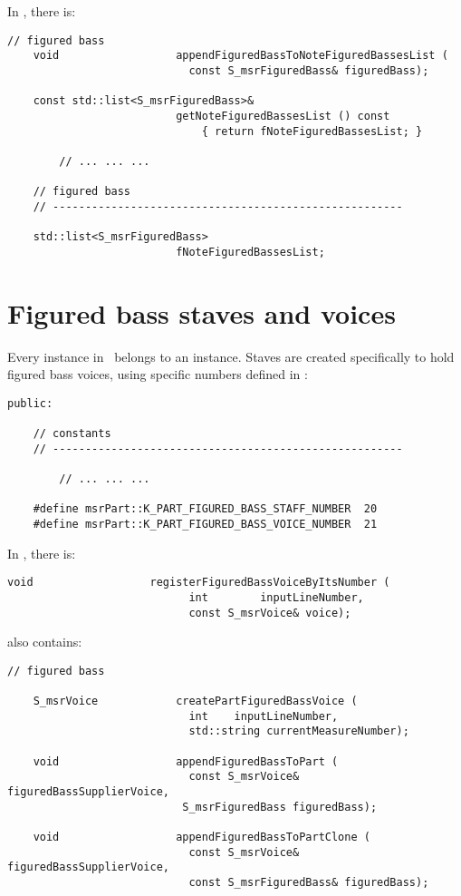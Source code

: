 In , there is:
\begin{lstlisting}[language=CPlusPlus]
    // figured bass
    void                  appendFiguredBassToNoteFiguredBassesList (
                            const S_msrFiguredBass& figuredBass);

    const std::list<S_msrFiguredBass>&
                          getNoteFiguredBassesList () const
                              { return fNoteFiguredBassesList; }

		// ... ... ...

    // figured bass
    // ------------------------------------------------------

    std::list<S_msrFiguredBass>
                          fNoteFiguredBassesList;
\end{lstlisting}


\section{Figured bass staves and voices}

Every  instance in \mf\ belongs to an  instance. Staves are created specifically to hold figured bass voices, using specific numbers defined in :
\begin{lstlisting}[language=CPlusPlus]
  public:

    // constants
    // ------------------------------------------------------

		// ... ... ...

    #define msrPart::K_PART_FIGURED_BASS_STAFF_NUMBER  20
    #define msrPart::K_PART_FIGURED_BASS_VOICE_NUMBER  21
\end{lstlisting}

In , there is:
\begin{lstlisting}[language=CPlusPlus]
     void                  registerFiguredBassVoiceByItsNumber (
                            int        inputLineNumber,
                            const S_msrVoice& voice);
\end{lstlisting}

 also contains:
\begin{lstlisting}[language=CPlusPlus]
    // figured bass

    S_msrVoice            createPartFiguredBassVoice (
                            int    inputLineNumber,
                            std::string currentMeasureNumber);

    void                  appendFiguredBassToPart (
                            const S_msrVoice&             figuredBassSupplierVoice,
                           S_msrFiguredBass figuredBass);

    void                  appendFiguredBassToPartClone (
                            const S_msrVoice&              figuredBassSupplierVoice,
                            const S_msrFiguredBass& figuredBass);
\end{lstlisting}

